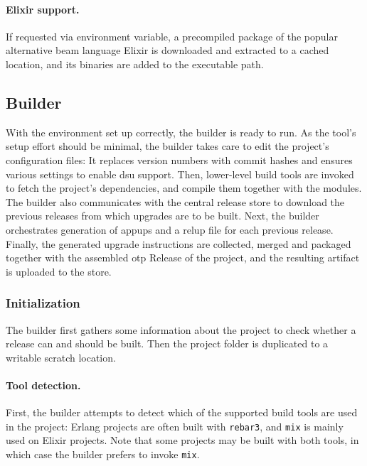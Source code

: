 \paragraph{Elixir support.} If requested via environment variable, a precompiled package of the popular alternative \acrshort{beam} language Elixir is downloaded and extracted to a cached location, and its binaries are added to the executable path.

\cleardoublepage
\subsection{Builder}

With the environment set up correctly, the builder is ready to run. As the tool's setup effort should be minimal, the builder takes care to edit the project's configuration files: It replaces version numbers with commit hashes and ensures various settings to enable \acrshort{dsu} support. Then, lower-level build tools are invoked to fetch the project's dependencies, and compile them together with the modules. The builder also communicates with the central release store to download the previous releases from which upgrades are to be built. Next, the builder orchestrates generation of \acrshort{appup}s and a \acrshort{relup} file for each previous release. Finally, the generated upgrade instructions are collected, merged and packaged together with the assembled \acrshort{otp} Release of the project, and the resulting artifact is uploaded to the store.

\subsubsection{Initialization}

The builder first gathers some information about the project to check whether a release can and should be built. Then the project folder is duplicated to a writable scratch location.

\paragraph{Tool detection.} First, the builder attempts to detect which of the supported build tools are used in the project: Erlang projects are often built with \lstinline|rebar3|, and \lstinline|mix| is mainly used on Elixir projects. Note that some projects may be built with both tools, in which case the builder prefers to invoke \lstinline|mix|.

